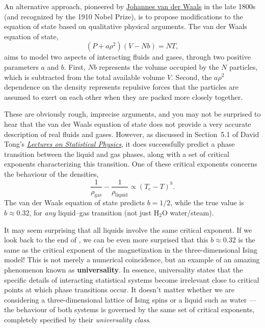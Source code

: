 An alternative approach, pioneered by \href{https://en.wikipedia.org/wiki/Johannes_Diderik_van_der_Waals}{Johannes van der Waals} in the late 1800s (and recognized by the 1910 Nobel Prize), is to propose modifications to the equation of state based on qualitative physical arguments.
The van der Waals equation of state,
\begin{equation*}
  \left(P + a\rho^2\right)\left(V - Nb\right) = NT,
\end{equation*}
aims to model two aspects of interacting fluids and gases, through two positive parameters $a$ and $b$.
First, $Nb$ represents the volume occupied by the $N$ particles, which is subtracted from the total available volume $V$.
Second, the $a\rho^2$ dependence on the density represents repulsive forces that the particles are assumed to exert on each other when they are packed more closely together.

These are obviously rough, imprecise arguments, and you may not be surprised to hear that the van der Waals equation of state does not provide a very accurate description of real fluids and gases.
However, as discussed in Section~5.1 of David Tong's \href{https://www.damtp.cam.ac.uk/user/tong/statphys.html}{\textit{Lectures on Statistical Physics}}, it does successfully predict a phase transition between the liquid and gas phases, along with a set of critical exponents characterizing this transition.
One of these critical exponents concerns the behaviour of the densities,
\begin{equation*}
  \frac{1}{\rho_{\text{gas}}} - \frac{1}{\rho_{\text{liquid}}} \propto \left(T_c - T\right)^b.
\end{equation*}
The van der Waals equation of state predicts $b = 1 / 2$, while the true value is $b \approx 0.32$, for \textit{any} liquid--gas transition (not just H$_2$O water/steam).

It may seem surprising that all liquids involve the same critical exponent.
If we look back to the end of , we can be even more surprised that this $b \approx 0.32$ is the same as the critical exponent of the magnetization in the three-dimensional Ising model!
This is not merely a numerical coincidence, but an example of an amazing phenomenon known as \textbf{universality}.
In essence, universality states that the specific details of interacting statistical systems become irrelevant close to critical points at which phase transitions occur.
It doesn't matter whether we are considering a three-dimensional lattice of Ising spins or a liquid such as water --- the behaviour of both systems is governed by the same set of critical exponents, completely specified by their \textit{universality class}.

